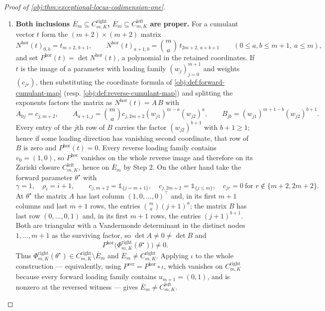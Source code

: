 \documentclass[11pt]{article}
\begin{document}
\begin{proof}[Proof of \cref{obj:thm:exceptional-locus-codimension-one}]
\begin{enumerate}

\item \textbf{Both inclusions \(\overline E_m\subseteq C^{\mathrm{right}}_{m,K}\), \(\overline E_m\subseteq C^{\mathrm{left}}_{m,K}\) are proper.}  For a cumulant vector \(t\) form the \((m+2)\times(m+2)\) matrix
\[
N^{\mathrm{hor}}(t)_{0,b}=t_{m+2,\,b+1},
\qquad
N^{\mathrm{hor}}(t)_{a+1,b}=\binom{m}{a}\,t_{2m+2,\,a+b+1}
\qquad (0\le a,b\le m+1,\ a\le m),
\]
and set \(P^{\mathrm{hor}}(t)=\det N^{\mathrm{hor}}(t)\), a polynomial in the retained coordinates.  If \(t\) is the image of a parameter with loading family \((w_j)_{j=0}^{m+1}\) and weights \((c_{jr})\), then substituting the coordinate formula of \cref{obj:def:forward-cumulant-map} (resp. \cref{obj:def:reverse-cumulant-map}) and splitting the exponents factors the matrix as \(N^{\mathrm{hor}}(t)=A\,B\) with
\[
A_{0j}=c_{j,m+2},
\qquad
A_{a+1,j}=\binom{m}{a}c_{j,2m+2}(w_{j1})^{m-a}(w_{j2})^{a},
\qquad
B_{jb}=(w_{j1})^{m+1-b}(w_{j2})^{b+1}.
\]
Every entry of the \(j\)th row of \(B\) carries the factor \((w_{j2})^{b+1}\) with \(b+1\ge1\); hence if some loading direction has vanishing second coordinate, that row of \(B\) is zero and \(P^{\mathrm{hor}}(t)=0\).  Every reverse loading family contains \(v_0=(1,0)\), so \(P^{\mathrm{hor}}\) vanishes on the whole reverse image and therefore on its Zariski closure \(C^{\mathrm{left}}_{m,K}\), hence on \(\overline E_m\) by Step 2.  On the other hand take the forward parameter \(\theta^{\star}\) with
\[
\gamma=1,\quad \rho_i=i+1,\qquad
c_{j,m+2}=\mathbb 1_{\{j=m+1\}},\quad
c_{j,2m+2}=\mathbb 1_{\{j\le m\}},\quad
c_{jr}=0\ \text{for }r\notin\{m+2,2m+2\}.
\]
At \(\theta^\star\) the matrix \(A\) has last column \((1,0,\ldots,0)^{\top}\) and, in its first \(m+1\) columns and last \(m+1\) rows, the entries \(\binom{m}{a}(j+1)^{a}\); the matrix \(B\) has last row \((0,\ldots,0,1)\) and, in its first \(m+1\) rows, the entries \((j+1)^{b+1}\).  Both are triangular with a Vandermonde determinant in the distinct nodes \(1,\ldots,m+1\) as the surviving factor, so \(\det A\ne0\ne\det B\) and
\[
P^{\mathrm{hor}}\bigl(\Phi^{\mathrm{right}}_{m,K}(\theta^\star)\bigr)\ne0 .
\]
Thus \(\Phi^{\mathrm{right}}_{m,K}(\theta^\star)\in C^{\mathrm{right}}_{m,K}\setminus\overline E_m\) and \(\overline E_m\ne C^{\mathrm{right}}_{m,K}\).  Applying \(\iota\) to the whole construction — equivalently, using \(P^{\mathrm{ver}}=P^{\mathrm{hor}}\circ\iota\), which vanishes on \(C^{\mathrm{right}}_{m,K}\) because every forward loading family contains \(u_{m+1}=(0,1)\), and is nonzero at the reversed witness — gives \(\overline E_m\ne C^{\mathrm{left}}_{m,K}\).

\end{enumerate}
\end{proof}
\end{document}
